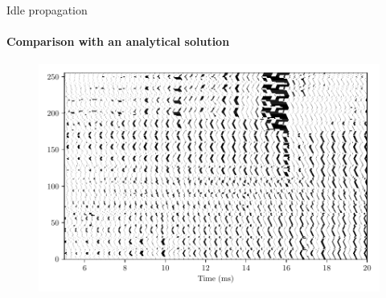 \documentclass[aspectratio=169]{beamer}
\begin{document}

\begin{frame}{Idle propagation}
    \framesubtitle{Comparison with an analytical solution}
    \begin{figure}
        \centering
        \includegraphics[width=0.8\linewidth]{Figures/idle_propagation_small.pdf}
    \end{figure}
\end{frame}

\end{document}
